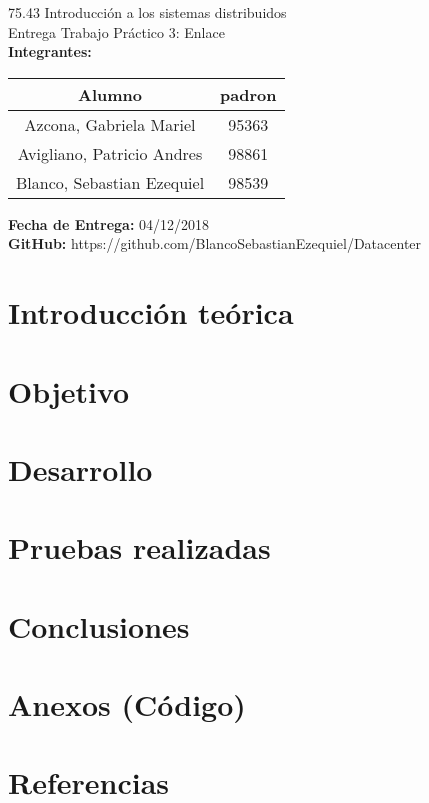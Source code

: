 
%

		
	\begin{titlepage}
		\vspace*{\fill}
		\begin{center}
			\Large 75.43 Introducción a los sistemas distribuidos \\
			\Huge Entrega Trabajo Práctico 3: Enlace \\
			\bigskip\bigskip\bigskip
			\large\textbf{Integrantes:} \\
			\begin{center}
				\begin{tabular}{||c | c||} 
					\hline
					Alumno & padron \\ [0.5ex] 
					\hline\hline
					Azcona, Gabriela Mariel & 95363 \\
					\hline
					Avigliano, Patricio Andres & 98861 \\
					\hline
					Blanco, Sebastian Ezequiel & 98539 \\
					\hline
				\end{tabular}
			\end{center}
			\textbf{Fecha de Entrega:} 04/12/2018\\
			\textbf{GitHub:} https://github.com/BlancoSebastianEzequiel/Datacenter\\

		\end{center}
		\vspace*{\fill}
	\end{titlepage}
	\newpage
			
	\tableofcontents
	\newpage
	\section{Introducción teórica}
		

	\newpage
	\section{Objetivo}
		

	\newpage
	\section{Desarrollo}
		

	\newpage
	\section{Pruebas realizadas}
		

	\newpage
	\section{Conclusiones}
		

	\newpage
	\section{Anexos (Código)}
		

	\newpage
	\section{Referencias}
		


